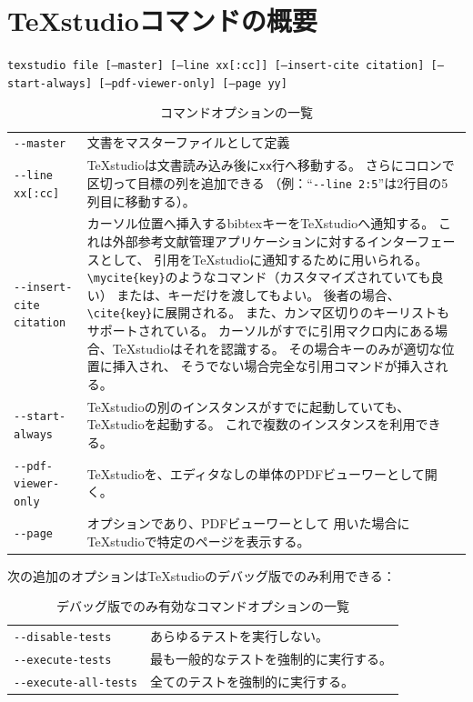 \section{TeXstudioコマンドの概要}

\texttt{texstudio file {[}--master{]} {[}--line xx{[}:cc{]}{]} {[}--insert-cite citation{]} {[}--start-always{]} {[}--pdf-viewer-only{]} {[}--page yy{]}}

\begin{table}[H]
  \centering
  \caption{コマンドオプションの一覧}
  \begin{tabularx}{\linewidth}{lX}
    \hline
    \verb+--master+ & 文書をマスターファイルとして定義\\
    \verb+--line xx[:cc]+
      & TeXstudioは文書読み込み後に\texttt{xx}行へ移動する。
      さらにコロンで区切って目標の列を追加できる
      （例：``\verb+--line 2:5+''は2行目の5列目に移動する）。\\
    \verb+--insert-cite citation+
      & カーソル位置へ挿入するbibtexキーをTeXstudioへ通知する。
      これは外部参考文献管理アプリケーションに対するインターフェースとして、
      引用をTeXstudioに通知するために用いられる。
      \verb+\mycite{key}+のようなコマンド（カスタマイズされていても良い）
      または、キーだけを渡してもよい。
      後者の場合、\verb+\cite{key}+に展開される。
      また、カンマ区切りのキーリストもサポートされている。
      カーソルがすでに引用マクロ内にある場合、TeXstudioはそれを認識する。
      その場合キーのみが適切な位置に挿入され、
      そうでない場合完全な引用コマンドが挿入される。\\
    \verb+--start-always+
      & TeXstudioの別のインスタンスがすでに起動していても、TeXstudioを起動する。
      これで複数のインスタンスを利用できる。\\
    \verb+--pdf-viewer-only+
      & TeXstudioを、エディタなしの単体のPDFビューワーとして開く。\\
    \verb+--page+
      & オプションであり、PDFビューワーとして
      用いた場合にTeXstudioで特定のページを表示する。\\
    \hline
  \end{tabularx}
\end{table}

次の追加のオプションはTeXstudioのデバッグ版でのみ利用できる：

\begin{table}[H]
  \centering
  \caption{デバッグ版でのみ有効なコマンドオプションの一覧}
  \begin{tabularx}{\linewidth}{lX}
    \hline
    \verb+--disable-tests+ & あらゆるテストを実行しない。\\
    \verb+--execute-tests+ & 最も一般的なテストを強制的に実行する。\\
    \verb+--execute-all-tests+ & 全てのテストを強制的に実行する。\\
    \hline
  \end{tabularx}
\end{table}

